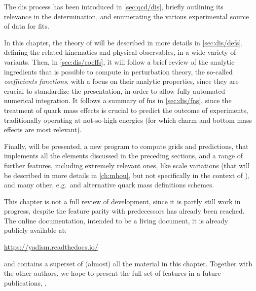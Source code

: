 
The \acrfull{dis} process has been introduced in \cref{sec:qcd/dis}, briefly
outlining its relevance in the \pdf determination, and enumerating the various
experimental source of \dis data for \pdf fits.

In this chapter, the theory of \dis will be described in more details in
\cref{sec:dis/defs}, defining the related kinematics and physical observables,
in a wide variety of variants.
Then, in \cref{sec:dis/coeffs}, it will follow a brief review of the analytic
ingredients that is possible to compute in perturbation theory, the so-called
\textit{coefficients functions}, with a focus on their analytic properties,
since they are crucial to standardize the presentation, in order to allow fully
automated numerical integration.
It follows a summary of \acrlong{fns} in \cref{sec:dis/fns}, since the
treatment of quark mass effects is crucial to predict the outcome of \dis
experiments, traditionally operating at not-so-high energies (for which charm
and bottom mass effects are most relevant).

Finally, \yadism will be presented, a new program to compute \dis grids and
predictions, that implements all the elements discussed in the preceding
sections, and a range of further features, including extremely relevant ones,
like scale variations (that will be described in more details in
\cref{ch:mhou}, but not specifically in the context of \dis), and many other,
e.g.\ \tmc and alternative quark mass definitions schemes.

This chapter is not a full review of \yadism development, since it is partly
still work in progress, despite the feature parity with predecessors has
already been reached.
%
The online documentation, intended to be a living document, it is already
publicly available at:
\begin{center}
  \url{https://yadism.readthedocs.io/}
\end{center}
and contains a superset of (almost) all the material in this chapter.
%
Together with the other authors, we hope to present the full set of features in
a future publications, \cite{yadism}.
